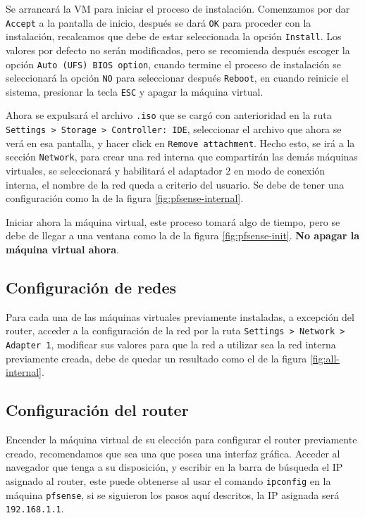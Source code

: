 \documentclass{article}
\begin{document}
            Se arrancará la VM para iniciar el proceso de instalación. Comenzamos por dar \texttt{Accept} a la pantalla de inicio, después se dará \texttt{OK} para proceder con la instalación, recalcamos que debe de estar seleccionada la opción \texttt{Install}. Los valores por defecto no serán modificados, pero se recomienda después escoger la opción \texttt{Auto (UFS) BIOS option}, cuando termine el proceso de instalación se seleccionará la opción \texttt{NO} para seleccionar después \texttt{Reboot}, en cuando reinicie el sistema, presionar la tecla \texttt{ESC} y apagar la máquina virtual.

            Ahora se expulsará el archivo \texttt{.iso} que se cargó con anterioridad en la ruta \texttt{Settings > Storage > Controller: IDE}, seleccionar el archivo que ahora se verá en esa pantalla, y hacer click en \texttt{Remove attachment}. Hecho esto, se irá a la sección \texttt{Network}, para crear una red interna que compartirán las demás máquinas virtuales, se seleccionará y habilitará el adaptador 2 en modo de conexión interna, el nombre de la red queda a criterio del usuario. Se debe de tener una configuración como la de la figura \ref{fig:pfsense-internal}.

            Iniciar ahora la máquina virtual, este proceso tomará algo de tiempo, pero se debe de llegar a una ventana como la de la figura \ref{fig:pfsense-init}. \textbf{No apagar la máquina virtual ahora}.
        
        \subsection{Configuración de redes}

            Para cada una de las máquinas virtuales previamente instaladas, a excepción del router, acceder a la configuración de la red por la ruta \texttt{Settings > Network > Adapter 1}, modificar sus valores para que la red a utilizar sea la red interna previamente creada, debe de quedar un resultado como el de la figura \ref{fig:all-internal}.

        \subsection{Configuración del router} \label{sec:router-config}

            Encender la máquina virtual de su elección para configurar el router previamente creado, recomendamos que sea una que posea una interfaz gráfica. Acceder al navegador que tenga a su disposición, y escribir en la barra de búsqueda el IP asignado al router, este puede obtenerse al usar el comando \texttt{ipconfig} en la máquina \texttt{pfsense}, si se siguieron los pasos aquí descritos, la IP asignada será \texttt{192.168.1.1}.
\end{document}
